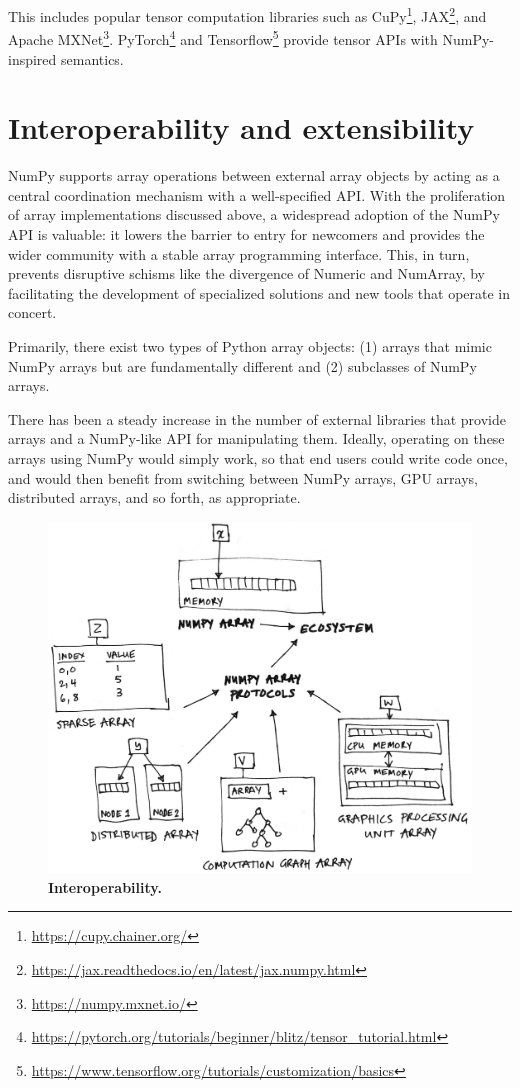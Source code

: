 This includes popular tensor computation libraries such as
CuPy\footnote{\url{https://cupy.chainer.org/}},
JAX\footnote{\url{https://jax.readthedocs.io/en/latest/jax.numpy.html}}, and
Apache MXNet\footnote{\url{https://numpy.mxnet.io/}}.
PyTorch\footnote{\url{https://pytorch.org/tutorials/beginner/blitz/tensor\_tutorial.html}}
and
Tensorflow\footnote{\url{https://www.tensorflow.org/tutorials/customization/basics}}
provide tensor APIs with NumPy-inspired semantics.

\section*{Interoperability and extensibility}

NumPy supports array operations between external array objects by
acting as a central coordination mechanism with a well-specified API.
With the proliferation of array implementations discussed above, a
widespread adoption of the NumPy API is valuable: it lowers the
barrier to entry for newcomers and provides the wider community with a
stable array programming interface. This, in turn, prevents disruptive
schisms like the divergence of Numeric and NumArray, by facilitating
the development of specialized solutions and new tools that operate in
concert.

Primarily, there
exist two types of Python array objects: (1) arrays that mimic NumPy arrays but are
fundamentally different and (2) subclasses of NumPy arrays.

There has been a steady increase in the number of external libraries that
provide arrays and a NumPy-like API for manipulating them.
Ideally, operating on these arrays using NumPy would simply work, so that end
users could write code once, and would then benefit from switching between
NumPy arrays, GPU arrays, distributed arrays, and so forth, as appropriate.

\begin{figure}
  \centering
  \includegraphics[width=.45\textwidth]{static/sketches/duck-arrays}
  \caption{\textbf{Interoperability.} }\label{fig:duck-arrays}
\end{figure}


